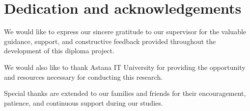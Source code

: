 %
%

\chapter{Dedication and acknowledgements}
\begin{SingleSpace}

We would like to express our sincere gratitude to our supervisor for the valuable guidance, support, and constructive feedback provided throughout the development of this diploma project.

We would also like to thank Astana IT University for providing the opportunity and resources necessary for conducting this research.

Special thanks are extended to our families and friends for their encouragement, patience, and continuous support during our studies.

\end{SingleSpace}
\clearpage
